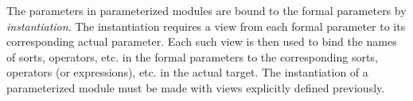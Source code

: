 The parameters in parameterized modules are bound to the formal parameters
by \emph{instantiation}. The 
instantiation requires a view from each formal parameter to its corresponding 
actual parameter. Each such view is then used to bind the names of sorts, 
operators, etc. in the formal parameters to the corresponding sorts, operators 
(or expressions), etc. in the actual target.
The instantiation of a parameterized module must be made with views 
explicitly defined previously.

















